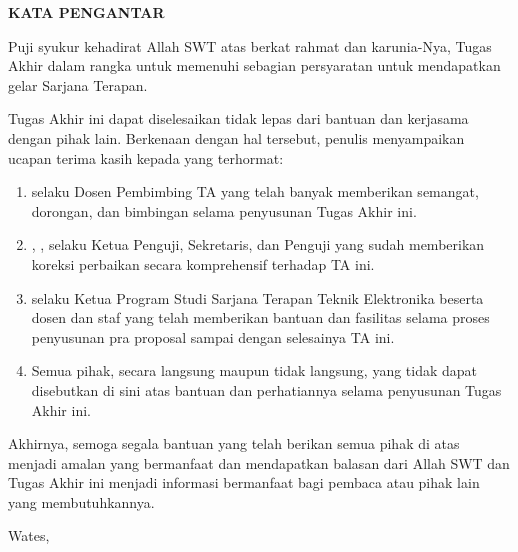 
\clearpage
{}
{}
\begin{center}
    \textbf{\large KATA PENGANTAR}\\[3em]
\end{center}

Puji syukur kehadirat Allah SWT atas berkat rahmat dan karunia-Nya, Tugas Akhir dalam rangka untuk memenuhi sebagian persyaratan untuk mendapatkan gelar Sarjana Terapan.

Tugas Akhir ini dapat diselesaikan tidak lepas dari bantuan dan kerjasama dengan pihak lain. Berkenaan dengan hal tersebut, penulis menyampaikan ucapan terima kasih kepada yang terhormat:

\begin{enumerate}
    \item {\pembimbing} selaku Dosen Pembimbing TA yang telah banyak memberikan semangat, dorongan, dan bimbingan selama penyusunan Tugas Akhir ini.
    \item {\pembimbing}, {\sekretaris}, {\penguji} selaku Ketua Penguji, Sekretaris, dan Penguji yang sudah  memberikan koreksi perbaikan secara komprehensif terhadap TA ini.
    \item {\koorprodi} selaku Ketua Program Studi Sarjana Terapan Teknik Elektronika beserta dosen dan staf yang telah memberikan bantuan dan fasilitas selama proses penyusunan pra proposal sampai dengan selesainya TA ini.
    \item Semua pihak, secara langsung maupun tidak langsung, yang tidak dapat disebutkan di sini atas bantuan dan perhatiannya selama penyusunan Tugas Akhir ini.
\end{enumerate}

Akhirnya, semoga segala bantuan yang telah berikan semua pihak di atas menjadi amalan yang bermanfaat dan mendapatkan balasan dari Allah SWT dan Tugas Akhir ini menjadi informasi bermanfaat bagi pembaca atau pihak lain yang membutuhkannya.

\begin{flushright}
    Wates, \tglpengesahan\\[1.25cm]
    \penulis \\
    \nim
\end{flushright}
